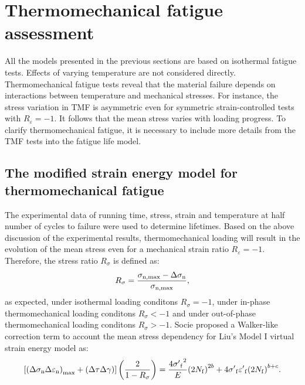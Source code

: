 \section{Thermomechanical fatigue assessment}
\noindent
All the models presented in the previous sections are based on isothermal fatigue tests. Effects of varying temperature are not considered directly. Thermomechanical fatigue tests reveal that the material failure depends on interactions between temperature and mechanical stresses. For instance, the stress variation in TMF is asymmetric even for symmetric strain-controlled tests with $R_{\varepsilon}=-1$. It follows that the mean stress varies with loading progress. To clarify thermomechanical fatigue, it is necessary to include more details from the TMF tests into the fatigue life model.

\subsection{The modified strain energy model for thermomechanical fatigue}
\noindent
The experimental data of running time, stress, strain and temperature at half number of cycles to failure were used to determine lifetimes.
Based on the above discussion of the experimental results, thermomechanical loading  will result in the evolution of the mean stress even for a mechanical strain ratio $R_{\varepsilon}=-1$. Therefore, the stress ratio ${R_\sigma }$ is defined as:
\begin{equation}
{R_\sigma } = \frac{{{\sigma _{\rm n,\max }} - \Delta {\sigma _{\rm n}}}}{{{\sigma _{\rm n,\max }}}},
\end{equation}
as expected, under isothermal loading conditons ${R_\sigma }=-1$, under in-phase thermomechanical loading conditons ${R_\sigma }<-1$ and under out-of-phase thermomechanical loading conditons ${R_\sigma }>-1$.
Socie \cite{Socie2000} proposed a Walker-like correction term \cite{Walker1970} to account the mean stress dependency for Liu's Model I virtual strain energy model as:
\begin{equation}
\left[ {{{\left( {\Delta {\sigma _{\rm n}}\Delta {\varepsilon _{\rm n}}} \right)}_{\max }} + \left( {\Delta \tau \Delta \gamma } \right)} \right]\left( {\frac{2}{{1 - {R_\sigma }}}} \right)
= \frac{{4{{\sigma '}_{\rm f}}^2}}{E}{\left( {2{N_{\rm f}}} \right)^{2b}} + 4{{\sigma '}_{\rm f}}{{\varepsilon '}_{\rm f}}{\left( {2{N_{\rm f}}} \right)^{b + c}}.
\label{Equ:LiuModelwithStressRatio}
\end{equation}

